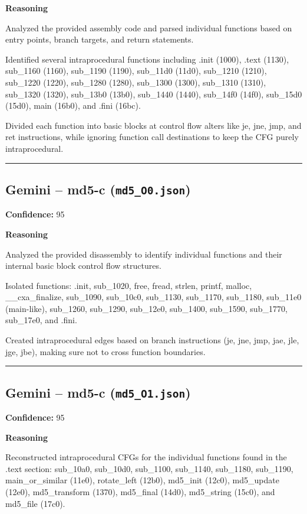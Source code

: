 \textbf{Reasoning}

Analyzed the provided assembly code and parsed individual functions based on entry points, branch targets, and return statements.

Identified several intraprocedural functions including .init (1000), .text (1130), sub\_1160 (1160), sub\_1190 (1190), sub\_11d0 (11d0), sub\_1210 (1210), sub\_1220 (1220), sub\_1280 (1280), sub\_1300 (1300), sub\_1310 (1310), sub\_1320 (1320), sub\_13b0 (13b0), sub\_1440 (1440), sub\_14f0 (14f0), sub\_15d0 (15d0), main (16b0), and .fini (16bc).

Divided each function into basic blocks at control flow alters like je, jne, jmp, and ret instructions, while ignoring function call destinations to keep the CFG purely intraprocedural.

\bigskip
\hrule
\bigskip

\subsection{Gemini -- md5-c (\texttt{md5\_O0.json})}

\textbf{Confidence:} 95

\textbf{Reasoning}

Analyzed the provided disassembly to identify individual functions and their internal basic block control flow structures.

Isolated functions: .init, sub\_1020, free, fread, strlen, printf, malloc, \_\_cxa\_finalize, sub\_1090, sub\_10c0, sub\_1130, sub\_1170, sub\_1180, sub\_11e0 (main-like), sub\_1260, sub\_1290, sub\_12e0, sub\_1400, sub\_1590, sub\_1770, sub\_17e0, and .fini.

Created intraprocedural edges based on branch instructions (je, jne, jmp, jae, jle, jge, jbe), making sure not to cross function boundaries.

\bigskip
\hrule
\bigskip

\subsection{Gemini -- md5-c (\texttt{md5\_O1.json})}

\textbf{Confidence:} 95

\textbf{Reasoning}

Reconstructed intraprocedural CFGs for the individual functions found in the .text section: sub\_10a0, sub\_10d0, sub\_1100, sub\_1140, sub\_1180, sub\_1190, main\_or\_similar (11e0), rotate\_left (12b0), md5\_init (12c0), md5\_update (12e0), md5\_transform (1370), md5\_final (14d0), md5\_string (15c0), and md5\_file (17c0).

